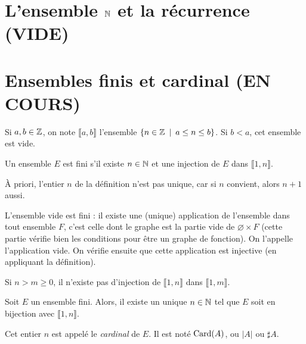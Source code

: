 
\section{L'ensemble $\mathbb{N}$ et la récurrence (VIDE)}

\section{Ensembles finis et cardinal (EN COURS)}

Si $a, b\in \mathbb{Z}$, on note $\llbracket a,b\rrbracket$ l'ensemble $\{n\in \mathbb{Z}\:\mid\: a\leq n \leq b\}$. Si $b<a$, cet ensemble est vide.

\begin{definition}
Un ensemble $E$ est fini s'il existe $n\in \mathbb{N}$ et une injection de $E$ dans $\llbracket 1,n\rrbracket$.
\end{definition}



À priori, l'entier $n$ de la définition n'est pas unique, car si $n$ convient, alors $n+1$ aussi.

\begin{remarque}[Zérologie]
L'ensemble vide est fini : il existe une (unique) application de l'ensemble dans tout ensemble $F$, c'est celle dont le graphe est la partie vide de $\varnothing\times F$ (cette partie vérifie bien les conditions pour être un graphe de fonction). On l'appelle \og l'application vide\fg.
On vérifie ensuite que cette application est injective (en appliquant la définition).
\end{remarque}

\begin{proposition}
Si $n>m\geq 0$, il n'existe pas d'injection de $\llbracket 1,n\rrbracket$ dans $\llbracket 1,m\rrbracket$.
\end{proposition}

\begin{propdef}
Soit $E$ un ensemble fini. Alors, il existe un unique $n\in \mathbb{N}$ tel que $E$ soit en bijection avec $\llbracket 1,n\rrbracket$.

Cet entier $n$ est appelé le \emph{cardinal} de $E$. Il est noté $\operatorname{Card}(A)$, ou $|A|$ ou $\sharp A$.
\end{propdef}


